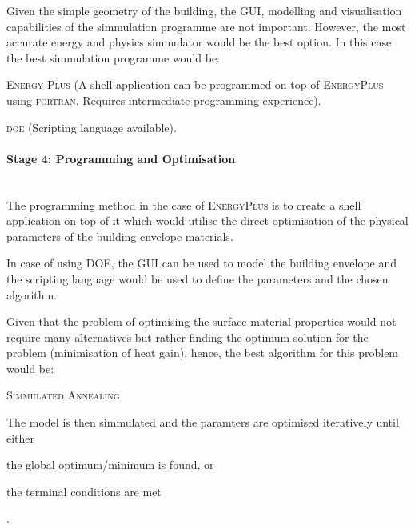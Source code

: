 Given the simple geometry of the building, the GUI, modelling and  visualisation capabilities of the simmulation programme are not important. However, the most accurate energy and physics simmulator would be the best option. In this case the best simmulation programme would be:

\begin{compactenum}
	\item \textsc{Energy Plus} (A shell application can be programmed on top of \textsc{EnergyPlus} using \textsc{fortran}. Requires intermediate programming experience).
	\item \textsc{doe} (Scripting language available).
\end{compactenum}

\paragraph{Stage 4: Programming and Optimisation}\mbox{}\\

The programming method in the case of \textsc{EnergyPlus} is to create a shell application on top of it which would utilise the direct optimisation of the physical parameters of the building envelope materials.

In case of using \textsc{DOE}, the GUI can be used to model the building envelope and the scripting language would be used to define the parameters and the chosen algorithm.

Given that the problem of optimising the surface material properties would not require many alternatives but rather finding the optimum solution for the problem (minimisation of heat gain), hence, the best algorithm for this problem would be:

\begin{compactenum}
\item \textsc{Simmulated Annealing}
\end{compactenum}

The model is then simmulated and the paramters are optimised iteratively until either \begin{inparaenum}[a)]\item the global optimum/minimum is found, or \item the terminal conditions are met\end{inparaenum}.
